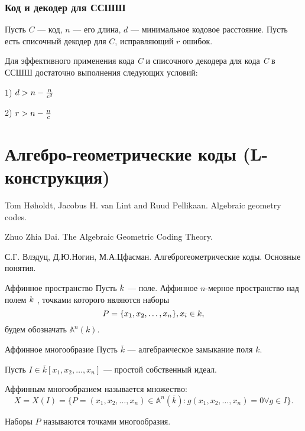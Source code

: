\documentclass{beamer}
\begin{document}
\begin {frame}
\frametitle {Код и декодер для ССШШ}
\begin {block}

Пусть $C$ --- код, $n$ --- его длина, $d$ --- минимальное кодовое расстояние. Пусть есть списочный декодер для $C$, исправляющий $r$ ошибок.

Для эффективного применения кода {\sl C} и списочного декодера для кода {\sl C} в ССШШ достаточно выполнения следующих условий:

1) $ {\sl d} > {\sl n} - \frac {\sl n}{\sl c^2}$

2)  $ {\sl r} > {\sl n} - \frac {\sl n}{\sl c}$
\end {block}
\end {frame}

\section {Алгебро-геометрические коды (L-конструкция)}

\begin {frame}
\tableofcontents[currentsection]
\end {frame}

\begin {frame}
Tom Høholdt, Jacobus H. van Lint and Ruud Pellikaan. Algebraic geometry codes.

Zhuo Zhia Dai. The Algebraic Geometric Coding Theory.

С.Г. Влэдуц, Д.Ю.Ногин, М.А.Цфасман. Алгеброгеометрические коды. Основные понятия.
\end {frame}

\begin {frame}  {Аффинное пространство}
Пусть ${\sl k}$ --- поле. Аффинное $n$-мерное пространство над полем ${\sl k}$ , точками которого являются наборы $$P =\{ x_1, x_2, \dots, x_n \}, x_i \in {\sl k},$$ будем обозначать ${\mathbb A^n}(k)$.
\end {frame}

\begin {frame}  {Аффинное многообразие}
Пусть ${\overline k}$ --- алгебраическое замыкание поля $k$.
\newline

Пусть $I \in {\overline k}[x_1, x_2, \dots, x_n]$ --- простой собственный идеал.
\newline
 \begin {block}

Аффинным многообразием называется множество: $$ X= X(I) = \{ P = (x_1, x_2, \dots, x_n) \in {\mathbb A^n}({\overline k}) : g(x_1, x_2, \dots, x_n) = 0 \forall g \in I \}.$$
\end {block}
Наборы $P$ называются точками многообразия.
\end {frame}
\end{document}
